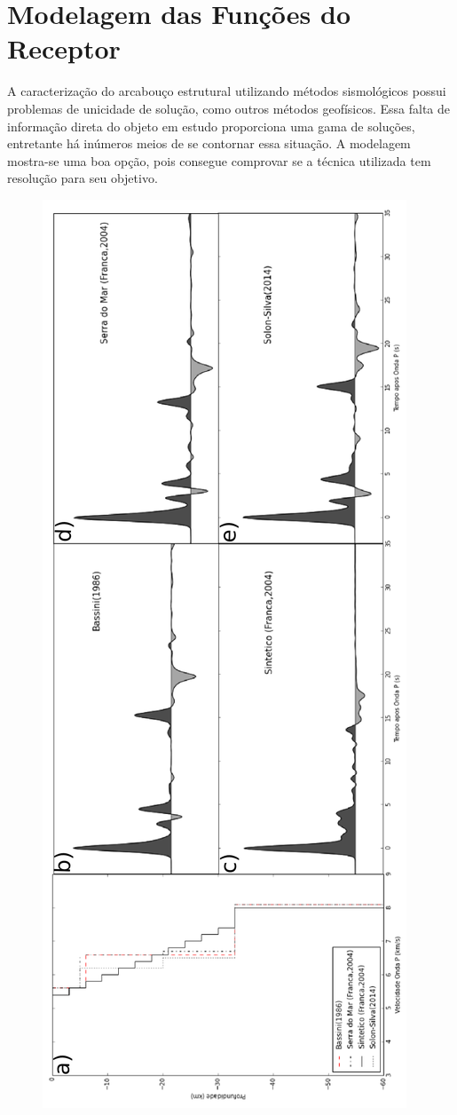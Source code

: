 \chapter{Modelagem das Funções do Receptor}
A caracterização do arcabouço estrutural utilizando métodos sismológicos possui problemas de unicidade de solução, como outros métodos geofísicos.  Essa falta de informação direta do objeto em estudo proporciona uma gama de soluções, entretante há inúmeros meios de se contornar essa situação. A modelagem mostra-se uma boa opção, pois consegue comprovar se a técnica utilizada tem resolução para seu objetivo.

\begin{figure}[!ht]
\centering
\includegraphics[scale=0.5]{modelagem_RF.png}

\end{figure}
